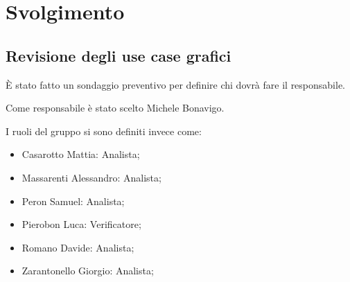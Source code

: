 \section{Svolgimento}

\subsection{Revisione degli use case grafici}

È stato fatto un sondaggio preventivo per definire chi dovrà fare il responsabile.

Come responsabile è stato scelto Michele Bonavigo.

I ruoli del gruppo si sono definiti invece come:
\begin{itemize}
    \item Casarotto Mattia: Analista;
    \item Massarenti Alessandro: Analista;
    \item Peron Samuel: Analista;
    \item Pierobon Luca: Verificatore;
    \item Romano Davide: Analista;
    \item Zarantonello Giorgio: Analista;
\end{itemize}